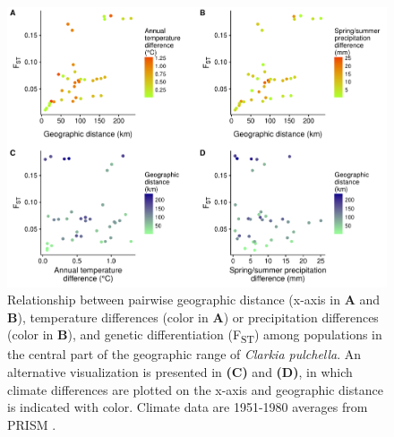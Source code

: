\documentclass{article}
\begin{document}
\begin{figure}[ht]
\centering
\includegraphics[width=16cm]{figs/fst_clim_dist_center.pdf}
\caption[Pairwise differences and genetic differentiation among central populations]{Relationship between pairwise geographic distance (x-axis in \textbf{A} and \textbf{B}), temperature differences (color in \textbf{A}) or precipitation differences (color in \textbf{B}), and genetic differentiation (F\textsubscript{ST}) among populations in the central part of the geographic range of \textit{Clarkia pulchella}. An alternative visualization is presented in \textbf{(C)} and \textbf{(D)}, in which climate differences are plotted on the x-axis and geographic distance is indicated with color.  Climate data are 1951-1980 averages from PRISM \citep{PRISM}.}
\label{fst_center}
\end{figure}

\clearpage
\end{document}
